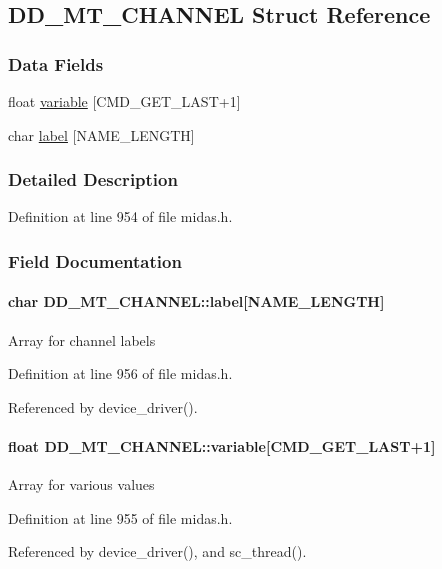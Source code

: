 \subsection{DD\_\-MT\_\-CHANNEL Struct Reference}
\label{structDD__MT__CHANNEL}
\subsubsection*{Data Fields}
\begin{DoxyCompactItemize}
\item 
float \hyperlink{structDD__MT__CHANNEL_ac75b2491b9c60c295e5c67e7b42150a7}{variable} \mbox{[}CMD\_\-GET\_\-LAST+1\mbox{]}
\item 
char \hyperlink{structDD__MT__CHANNEL_a9f3418338f716f8780e5bf9f2b650229}{label} \mbox{[}NAME\_\-LENGTH\mbox{]}
\end{DoxyCompactItemize}


\subsubsection{Detailed Description}


Definition at line 954 of file midas.h.

\subsubsection{Field Documentation}
\paragraph[{label}]{\setlength{\rightskip}{0pt plus 5cm}char {\bf DD\_\-MT\_\-CHANNEL::label}\mbox{[}NAME\_\-LENGTH\mbox{]}}\hfill\label{structDD__MT__CHANNEL_a9f3418338f716f8780e5bf9f2b650229}
Array for channel labels 

Definition at line 956 of file midas.h.

Referenced by device\_\-driver().
\paragraph[{variable}]{\setlength{\rightskip}{0pt plus 5cm}float {\bf DD\_\-MT\_\-CHANNEL::variable}\mbox{[}CMD\_\-GET\_\-LAST+1\mbox{]}}\hfill\label{structDD__MT__CHANNEL_ac75b2491b9c60c295e5c67e7b42150a7}
Array for various values 

Definition at line 955 of file midas.h.

Referenced by device\_\-driver(), and sc\_\-thread().